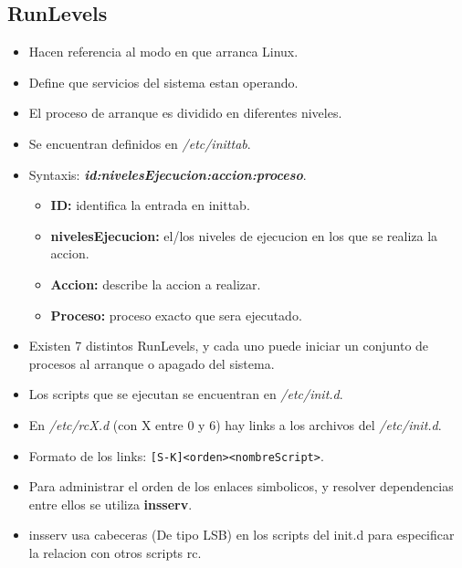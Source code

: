 \documentclass[11pt]{article}
\begin{document}
\subsection{RunLevels}
\begin{itemize}
    \item Hacen referencia al modo en que arranca Linux.
    \item Define que servicios del sistema estan operando.
    \item El proceso de arranque es dividido en diferentes niveles.
    \item Se encuentran definidos en \textit{/etc/inittab}.
    \item Syntaxis: \textbf{\textit{id:nivelesEjecucion:accion:proceso}}.
    \begin{itemize}
        \item \textbf{ID: }identifica la entrada en inittab.
        \item \textbf{nivelesEjecucion: }el/los niveles de ejecucion en los que se realiza la accion.
        \item \textbf{Accion: }describe la accion a realizar.
        \item \textbf{Proceso: }proceso exacto que sera ejecutado.
    \end{itemize}
    \item Existen 7 distintos RunLevels, y cada uno puede iniciar un conjunto de procesos al arranque o apagado del sistema.
    \item Los scripts que se ejecutan se encuentran en \textit{/etc/init.d}.
    \item En \textit{/etc/rcX.d} (con X entre 0 y 6) hay links a los archivos del \textit{/etc/init.d}.
    \item Formato de los links: \verb|[S-K]<orden><nombreScript>|.
    \item Para administrar el orden de los enlaces simbolicos, y resolver dependencias entre ellos se utiliza \textbf{insserv}.
    \item insserv usa cabeceras (De tipo LSB) en los scripts del init.d para especificar la relacion con otros scripts rc.
\end{itemize}
\end{document}
